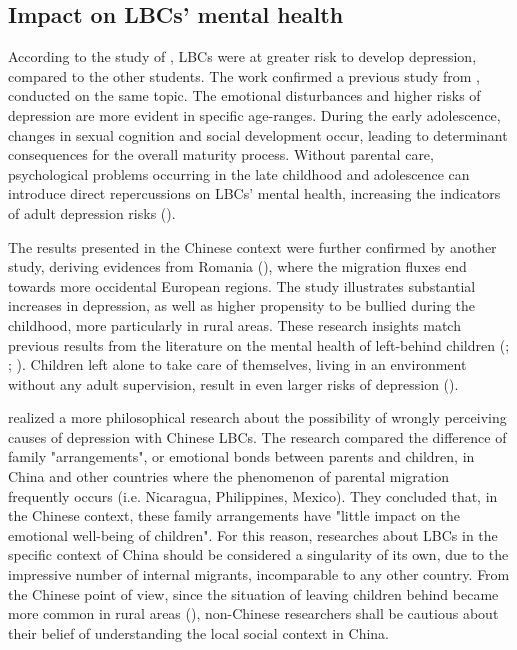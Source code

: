 \subsection{Impact on LBCs' mental health}

According to the study of \textcite{he2012depression}, LBCs were at greater risk to develop depression, compared to the other students. The work confirmed a previous study from \textcite{fan2010emotional}, conducted on the same topic. The emotional disturbances and higher risks of depression are more evident in specific age-ranges. During the early adolescence, changes in sexual cognition and social development occur, leading to determinant consequences for the overall maturity process. Without parental care, psychological problems occurring in the late childhood and adolescence can introduce direct repercussions on LBCs' mental health, increasing the indicators of adult depression risks  (\cite{kosterman2010assessment}).

The results presented in the Chinese context were further confirmed by another study, deriving evidences from Romania (\cite{botezat2014impact}), where the migration fluxes end towards more occidental European regions. The study illustrates substantial increases in depression, as well as higher propensity to be bullied during the childhood, more particularly in rural areas. These research insights match previous results from the literature on the mental health of left-behind children (\cite{gibson2011happens}; \cite{dreby2007children}; \cite{mazzucato2011transnational}). Children left alone to take care of themselves, living in an environment without any adult supervision, result in even larger risks of depression (\cite{lahaie2009work}).

\textcite{ren2016consequences} realized a more philosophical research about the possibility of wrongly perceiving causes of depression with Chinese LBCs. The research compared the difference of family "arrangements", or emotional bonds between parents and children, in China and other countries where the phenomenon of parental migration frequently occurs (i.e. Nicaragua, Philippines, Mexico). They concluded that, in the Chinese context, these family arrangements have "little impact on the emotional well-being of children". For this reason, researches about LBCs in the specific context of China should be considered a singularity of its own, due to the impressive number of internal migrants, incomparable to any other country. From the Chinese point of view, since the situation of leaving children behind became more common in rural areas (\cite{hao2006discussion}), non-Chinese researchers shall be cautious about their belief of understanding the local social context in China.



